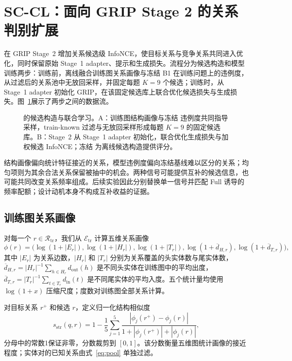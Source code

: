 \section{SC-CL：面向 GRIP Stage 2 的关系判别扩展}

\scc{} 在 GRIP Stage~2 增加关系候选级 InfoNCE，使目标关系与竞争关系共同进入优化，同时保留原始 Stage~1 adapter、提示和生成损失。流程分为候选构造和模型训练两步：训练前，离线融合训练图关系画像与冻结 B1 在训练问题上的违例度，从过滤后的关系池中无放回采样，并固定每题 $K=9$ 个候选；训练时，从 Stage~1 adapter 初始化 GRIP，在该固定候选库上联合优化候选损失与生成损失。图~\ref{fig:mechanism}展示了两步之间的数据流。

\begin{figure}[H]
    \centering
    \resizebox{\linewidth}{!}{}
    \caption{\scc{} 的候选构造与联合学习。A：训练图结构画像与冻结 \bone{} 违例度共同指导采样，train-known 过滤与无放回采样形成每题 $K=9$ 的固定候选库。B：Stage~2 从 Stage~1 adapter 初始化，联合优化生成损失与加权候选 InfoNCE；冻结 \bone{} 为离线候选构造提供评分。}
    \label{fig:mechanism}
\end{figure}

结构画像偏向统计特征接近的关系，模型违例度偏向冻结基线难以区分的关系；均匀项则为其余合法关系保留被抽中的机会。两种信号可能提供互补的候选信息，也可能共同改变关系频率组成。后续实验因此分别替换单一信号并匹配 Full 诱导的频率配额；设计动机本身不构成互补收益的证据。

\subsection{训练图关系画像}

对每一个 $r\in\mathcal{R}_{\mathrm{tr}}$，我们从 $\mathcal{E}_{\mathrm{tr}}$ 计算五维关系画像
\begin{equation}
    \phi(r)=\bigl(\log(1+|E_r|),\log(1+|H_r|),\log(1+|T_r|),
    \log(1+\overline{d}_{H,r}),\log(1+\overline{d}_{T,r})\bigr),
    \label{eq:profile}
\end{equation}
其中 $|E_r|$ 为关系边数，$|H_r|$ 和 $|T_r|$ 分别为关系覆盖的头实体数与尾实体数，
$\overline{d}_{H,r}=|H_r|^{-1}\sum_{h\in H_r}d_{\mathrm{out}}(h)$ 是不同头实体在训练图中的平均出度，$\overline{d}_{T,r}=|T_r|^{-1}\sum_{t\in T_r}d_{\mathrm{in}}(t)$ 是不同尾实体的平均入度。五个统计量均使用 $\log(1+x)$ 压缩尺度；度数对训练图全部关系计算。

对目标关系 $r^+$ 和候选 $r$，定义归一化结构相似度
\begin{equation}
    s_{\mathrm{str}}(q,r)=1-\frac{1}{5}\sum_{j=1}^{5}
    \frac{|\phi_j(r^+)-\phi_j(r)|}
    {1+|\phi_j(r^+)|+|\phi_j(r)|},
    \label{eq:similarity}
\end{equation}
分母中的常数1保证非零，分数裁剪到 $[0,1]$。该分数衡量五维图统计画像的接近程度；实体对的已知关系由式~\ref{eq:pool} 单独过滤。

